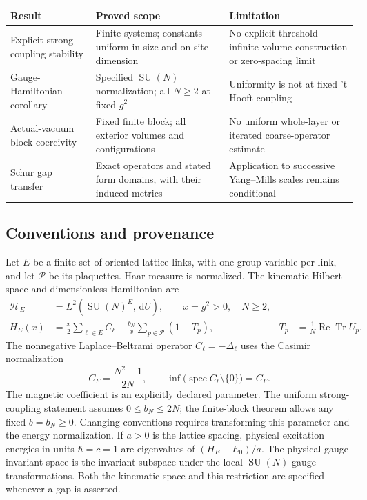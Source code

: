 \documentclass[11pt]{article}
\theoremstyle{definition}
\theoremstyle{remark}
\DeclareMathOperator{\SU}{SU}
\DeclareMathOperator{\Tr}{Tr}
\newcommand{\dd}{\,\mathrm d}
\numberwithin{equation}{section}
\begin{document}
\begin{center}
\small
\begin{tabular}{@{}p{}p{}p{}@{}}
\toprule
Result & Proved scope & Limitation\\
\midrule
Explicit strong-coupling stability &
Finite systems; constants uniform in size and on-site dimension &
No explicit-threshold infinite-volume construction or zero-spacing limit\\[4pt]
Gauge-Hamiltonian corollary &
Specified $\SU(N)$ normalization; all $N\ge2$ at fixed $g^2$ &
Uniformity is not at fixed 't Hooft coupling\\[4pt]
Actual-vacuum block coercivity &
Fixed finite block; all exterior volumes and configurations &
No uniform whole-layer or iterated coarse-operator estimate\\[4pt]
Schur gap transfer &
Exact operators and stated form domains, with their induced metrics &
Application to successive Yang--Mills scales remains conditional\\
\bottomrule
\end{tabular}
\end{center}

\subsection{Conventions and provenance}

Let $E$ be a finite set of oriented lattice links, with one group variable
per link, and let $\mathcal P$ be its plaquettes. Haar measure is normalized.
The kinematic Hilbert space and dimensionless Hamiltonian are
\begin{align}
 \mathcal H_E&=L^2(\SU(N)^E,\dd U), \qquad x=g^2>0,\quad N\ge2,\\
 H_E(x)&=\frac{x}{2}\sum_{\ell\in E}C_\ell+
          \frac{b_N}{x}\sum_{p\in\mathcal P}(1-T_p),&
 T_p&=\frac1N\operatorname{Re}\Tr U_p .\label{eq:hamiltonian}
\end{align}
The nonnegative Laplace--Beltrami operator $C_\ell=-\Delta_\ell$ uses the
Casimir normalization
\begin{equation}
 C_F=\frac{N^2-1}{2N},\qquad
 \inf\bigl(\operatorname{spec}C_\ell\setminus\{0\}\bigr)=C_F.
\end{equation}
The magnetic coefficient is an explicitly declared parameter.
The uniform strong-coupling statement assumes $0\le b_N\le2N$;
the finite-block theorem allows any fixed $b=b_N\ge0$. Changing conventions
requires transforming this parameter and the energy normalization.
If $a>0$ is the lattice spacing, physical excitation energies in units
$\hbar=c=1$ are eigenvalues of $(H_E-E_0)/a$.
The physical gauge-invariant space is the invariant subspace under the
local $\SU(N)$ gauge transformations. Both the kinematic space and this
restriction are specified whenever a gap is asserted.
\end{document}
